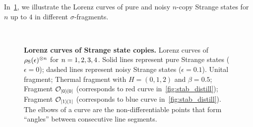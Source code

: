 \documentclass[pra,
aps,
twocolumn,
superscriptaddress,
groupedaddress,
nofootinbib,
reprint
]{revtex4-1}
\begin{document}
In~\cref{fig:lcs}, we illustrate the Lorenz curves of pure and noisy $n$-copy Strange states for $n$ up to $4$ in different $\sigma$-fragments.
\begin{figure}%
    \centering
    \hspace{1pt}%
    \\
    \hspace{1pt}%
    \caption{\textbf{Lorenz curves of Strange state copies.} Lorenz curves of $\rho_{\rm{S}}(\epsilon)^{\otimes n}$ for $n=1,2,3,4$.
    Solid lines represent pure Strange states ($\epsilon = 0$); dashed lines represent noisy Strange states ($\epsilon = 0.1$).
     Unital fragment;  Thermal fragment with $H = (0,1,2)$ and $\beta = 0.5$;  Fragment $\mathcal{O}_{\ketbra{0}{0}}$ (corresponds to red curve in~\cref{fig:stab_distill});  Fragment $\mathcal{O}_{\ketbra{1}{1}}$ (corresponds to blue curve in~\cref{fig:stab_distill}).
    The elbows of a curve are the non-differentiable points that form ``angles'' between consecutive line segments.
    }%
    \label{fig:lcs}
\end{figure}
\end{document}

